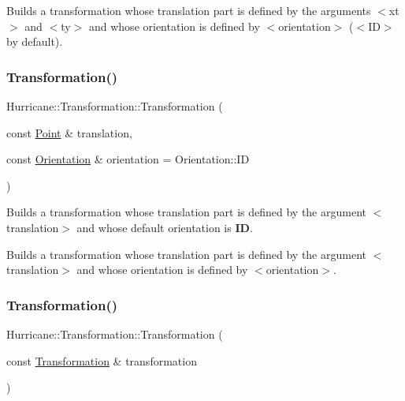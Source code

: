 Builds a transformation whose translation part is defined by the arguments {\ttfamily $<$xt$>$} and {\ttfamily $<$ty$>$} and whose orientation is defined by {\ttfamily $<$orientation$>$} ({\ttfamily $<$ID$>$} by default). \mbox{\label{classHurricane_1_1Transformation_a01a6844815e536ca38d549a13b6c034f}} 
\subsubsection{\texorpdfstring{Transformation()}{Transformation()}\hspace{0.1cm}{\footnotesize\ttfamily [3/4]}}
{\footnotesize\ttfamily Hurricane\+::\+Transformation\+::\+Transformation (\begin{DoxyParamCaption}\item[{const \mbox{\hyperlink{classHurricane_1_1Point}{Point}} \&}]{translation,  }\item[{const \mbox{\hyperlink{classHurricane_1_1Transformation_1_1Orientation}{Orientation}} \&}]{orientation = {\ttfamily Orientation\+:\+:ID} }\end{DoxyParamCaption})}

Builds a transformation whose translation part is defined by the argument {\ttfamily $<$translation$>$} and whose default orientation is {\bfseries ID}.

Builds a transformation whose translation part is defined by the argument {\ttfamily $<$translation$>$} and whose orientation is defined by {\ttfamily $<$orientation$>$}. \mbox{\label{classHurricane_1_1Transformation_acd94913a75fd4d3624b89e50acf4962f}} 
\subsubsection{\texorpdfstring{Transformation()}{Transformation()}\hspace{0.1cm}{\footnotesize\ttfamily [4/4]}}
{\footnotesize\ttfamily Hurricane\+::\+Transformation\+::\+Transformation (\begin{DoxyParamCaption}\item[{const \mbox{\hyperlink{classHurricane_1_1Transformation}{Transformation}} \&}]{transformation }\end{DoxyParamCaption})}

